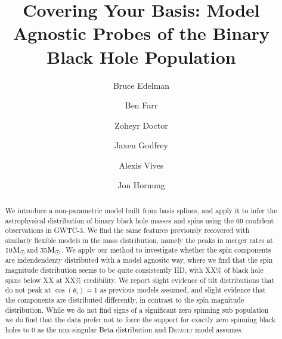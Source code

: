 \documentclass[twocolumn, linenumber]{aastex63}
\newcommand{\msun}{\ensuremath{{\rm M}_\odot}}
\begin{document}
\title{Covering Your Basis: Model Agnostic Probes of the Binary Black Hole Population}

\author{Bruce Edelman}

\author{Ben Farr}

\author{Zoheyr Doctor}

\author{Jaxen Godfrey}

\author{Alexis Vives}

\author{Jon Hornung}

\begin{abstract}                 
We introduce a non-parametric model built from basis splines, and apply it to infer the astrophysical distribution of 
binary black hole masses and spins using the 69 confident observations in GWTC-3. We find the same features previously recovered 
with similarly flexible models in the mass distribution, namely the peaks in merger rates at \~10\msun and \~35\msun. 
We apply our method to investigate whether the spin components are indendendenty distributed with a model agnositc way, where we find that 
the spin magnitude distribution seems to be quite consistently IID, with XX\% of black hole spins below XX at XX\% credibility. We report 
slight evidence of tilt distributions that do not peak at $\cos(\theta_i) = 1$ as previous models assumed, and slight evidence that 
the components are distributed differently, in contrast to the spin magnitude distribution. While we do not find signs of a significant
zero spinning sub population we do find that the data prefer not to force the support for exactly zero spinning black holes to 0 as 
the non-singular Beta distribution and \textsc{Default} model assumes. 
\end{abstract}
\end{document}
